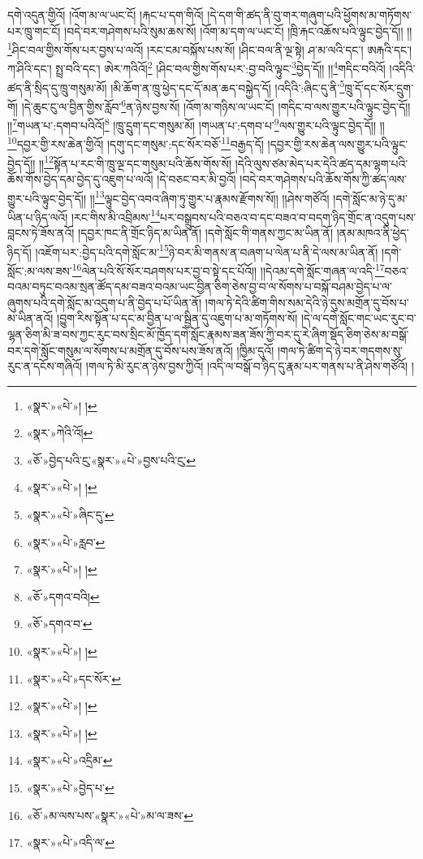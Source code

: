 དགེ་འདུན་གྱིའོ། །འོག་མ་ལ་ཡང་ངོ། །རྐང་པ་དག་གིའོ། །དེ་དག་གི་ཚད་ནི་བུ་གར་གཞུག་པའི་ཕྱོགས་མ་གཏོགས་པར་ཁྲུ་གང་ངོ། །བདེ་བར་གཤེགས་པའི་སུམ་ཆས་སོ། །འོག་མ་དག་ལ་ཡང་ངོ། །ཁྲི་རྐང་འཆོས་པའི་ལྟུང་བྱེད་དོ།། །།\footnote{«སྣར་»«པེ་»། །}ཤིང་བལ་གྱིས་གོས་པར་བྱས་པ་ལའོ། །རང་ངམ་བསྐོས་པས་སོ། །ཤིང་བལ་ནི་ལྔ་སྟེ། ཤ་མ་ལའི་དང་། ཨརྐའི་དང་། ཀ་ཤིའི་དང་། སྤྲ་བའི་དང་། ཨེར་ཀའིའོ།\footnote{«སྣར་»ཀེའི་འོ།} །ཤིང་བལ་གྱིས་གོས་པར་:བྱ་བའི་ལྟུང་\footnote{«ཅོ་»བྱེད་པའི་ུང་«སྣར་»«པེ་»བྱས་པའི་ུང་}བྱེད་དོ།། །།\footnote{«སྣར་»«པེ་»། །}གདིང་བའིའོ། །འདིའི་ཚད་ནི་སྲིད་དུ་ཁྲུ་གསུམ་མོ། །མི་ཆོག་ན་ཁྲུ་ཕྱེད་དང་དོ་མན་ཆད་བསྐྱེད་དོ། །འདིའི་:ཞིང་དུ་ནི་\footnote{«སྣར་»«པེ་»ཞིང་དུ་}ཁྲུ་དོ་དང་སོར་དྲུག་གོ། །དེ་ཆུང་ངུ་ལ་བྱིན་གྱིས་རློབ་\footnote{«སྣར་»«པེ་»རླབ་}ན་ཉེས་བྱས་སོ། །འོག་མ་གཉིས་ལ་ཡང་ངོ། །གདིང་བ་ལས་གྱུར་པའི་ལྟུང་བྱེད་དོ།། །།\footnote{«སྣར་»«པེ་»། །}གཡན་པ་:དགབ་པའིའོ།\footnote{«ཅོ་»དགའ་བའི།} །ཁྲུ་དྲུག་དང་གསུམ་མོ། །གཡན་པ་:དགབ་པ་\footnote{«ཅོ་»དགའ་བ་}ལས་གྱུར་པའི་ལྟུང་བྱེད་དོ།། །།\footnote{«སྣར་»«པེ་»། །}དབྱར་གྱི་རས་ཆེན་གྱིའོ། །དགུ་དང་གསུམ་:དང་སོར་བཅོ་\footnote{«སྣར་»«པེ་»དང་སོར་}བརྒྱད་དོ། །དབྱར་གྱི་རས་ཆེན་ལས་གྱུར་པའི་ལྟུང་བྱེད་དོ།། །།\footnote{«སྣར་»«པེ་»། །}སྟོན་པ་རང་གི་ཁྲུ་ལྔ་དང་གསུམ་པའི་ཆོས་གོས་སོ། །དེའི་ལུས་ཙམ་མེད་པར་དེའི་ཚད་དམ་ལྷག་པའི་ཆོས་གོས་བྱེད་དམ་བྱེད་དུ་འཇུག་པ་ལའོ། །དེ་བཅང་བར་མི་བྱའོ། །བདེ་བར་གཤེགས་པའི་ཆོས་གོས་ཀྱི་ཚད་ལས་གྱུར་པའི་ལྟུང་བྱེད་དོ།། །།\footnote{«སྣར་»«པེ་»། །}ལྟུང་བྱེད་འབའ་ཞིག་ཏུ་གྱུར་པ་རྣམས་རྫོགས་སོ།། །།ཤེས་གཙོའོ། །དགེ་སློང་མ་ཉེ་དུ་མ་ཡིན་པ་ཉིད་ལའོ། །རང་གིས་མི་འབྲིམས་\footnote{«སྣར་»«པེ་»འདྲིམ་}པར་བསྒྲུབས་པའི་བཅའ་བ་དང་བཟའ་བ་བདག་ཉིད་གྲོང་ན་འདུག་པས་བླངས་ཏེ་ཟོས་ནའོ། །དབྱར་ཁང་ནི་གྲོང་ཉིད་མ་ཡིན་ནོ། །དགེ་སློང་གི་གནས་ཀྱང་མ་ཡིན་ནོ། །ནམ་མཁའ་ནི་ཕྱེད་ཉིད་དོ། །འཇོག་པར་:བྱེད་པའི་དགེ་སློང་མ་\footnote{«སྣར་»«པེ་»བྱེད་པ་}ཉེ་བར་མི་གནས་ན་བཞག་པ་ལེན་པ་ནི་དེ་ལས་མ་ཡིན་ནོ། །དགེ་སློང་:མ་ལས་ཟས་\footnote{«ཅོ་»མ་ལས་པས་«སྣར་»«པེ་»མ་ལ་ཟས་}ལེན་པའི་སོ་སོར་བཤགས་པར་བྱ་བ་སྟེ་དང་པོའོ།། །།དེའམ་དགེ་སློང་གཞན་ལ་འདི་\footnote{«སྣར་»«པེ་»འདི་ལ་}བཅའ་བའམ་བཏུང་བའམ་སྲན་ཚོད་དམ་བཟའ་བའམ་ཡང་བྱིན་ཅིག་ཅེས་བྱ་བ་ལ་སོགས་པ་བསྐོ་བཤམ་བྱེད་པ་ལ་ཞུགས་པའི་དགེ་སློང་མ་འདུག་པ་ནི་བྱེད་པ་པོ་ཡིན་ནོ། །གལ་ཏེ་དེའི་ཚིག་གིས་སམ་དེའི་ཉེ་དུས་མགྲོན་དུ་བོས་པ་མ་ཡིན་ནའོ། །བྱུག་རིས་སྟོན་པ་དང་མ་བྱིན་པ་ལ་སྦྱིན་དུ་འཇུག་པ་མ་གཏོགས་སོ། །དེ་ལ་དགེ་སློང་གང་ཡང་རུང་བ་ལྷན་ཅིག་མི་ཟ་བས་ཀྱང་རུང་བས་སྲིང་མོ་ཁྱོད་དགེ་སློང་རྣམས་ཟན་ཟོས་ཀྱི་བར་དུ་རེ་ཞིག་སྡོད་ཅིག་ཅེས་མ་བསྒོ་བར་དགེ་སློང་གསུམ་ལ་སོགས་པ་མགྲོན་དུ་བོས་པས་ཟོས་ནའོ། །ཁྱིམ་དུའོ། །གལ་ཏེ་ཚིག་དེ་ཉེ་བར་གདགས་སུ་རུང་ན་དངོས་གཞིའོ། །གལ་ཏེ་མི་རུང་ན་ཉེས་བྱས་ཀྱིའོ། །འདི་ལ་བསྒོ་བ་ཉིད་དུ་རྣམ་པར་གནས་པ་ནི་ཤེས་གཙོའོ། །
